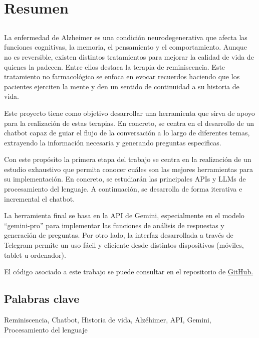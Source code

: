 \chapter*{Resumen}
\section*{\tituloPortadaVal}
La enfermedad de Alzheimer es una condición neurodegenerativa que afecta las funciones cognitivas, la memoria, el pensamiento y el comportamiento. Aunque no es reversible, existen distintos tratamientos para mejorar la calidad de vida de quienes la padecen.  Entre ellos destaca la terapia de reminiscencia. Este tratamiento no farmacológico se enfoca en evocar recuerdos haciendo que los pacientes ejerciten la mente y den un sentido de continuidad a su historia de vida.

Este proyecto tiene como objetivo desarrollar una herramienta que sirva de apoyo para la realización de estas terapias. En concreto, se centra en el desarrollo de un chatbot capaz de guiar el flujo de la conversación a lo largo de diferentes temas, extrayendo la información necesaria y generando preguntas especificas. 

Con este propósito la primera etapa del trabajo se centra en la realización de un estudio exhaustivo que permita conocer cuáles son las mejores herramientas para su implementación. En concreto, se estudiarán las principales APIs y LLMs de procesamiento del lenguaje.  A continuación, se desarrolla de forma iterativa e incremental el chatbot. 

La herramienta final se basa en la API de Gemini, especialmente en el modelo ``gemini-pro'' para implementar las funciones de análisis de respuestas y generación de preguntas. Por otro lado, la interfaz desarrollada a través de Telegram permite un uso fácil y eficiente desde distintos dispositivos (móviles, tablet u ordenador). 
 
El código asociado a este trabajo se puede consultar en el repositorio de \href{https://github.com/mavice07/TFG-ChatBotCantor.git}{GitHub.}

\section*{Palabras clave}
   
\noindent Reminiscencia, Chatbot, Historia de vida, Alzéhimer, API, Gemini, Procesamiento del lenguaje

   


